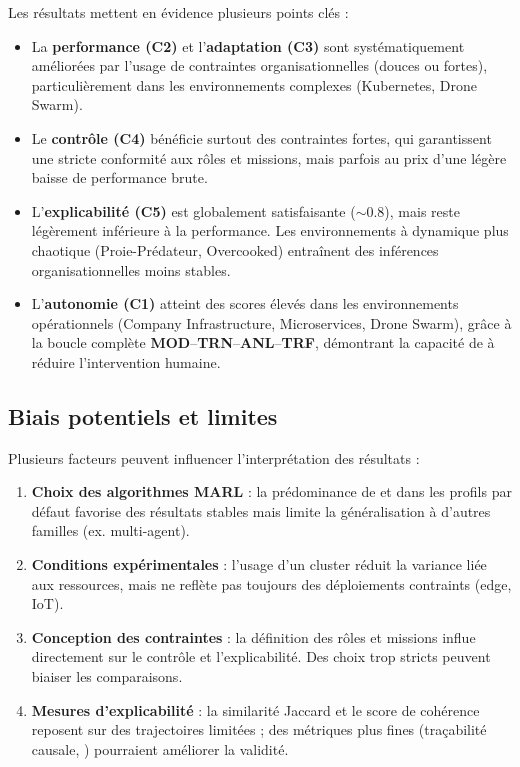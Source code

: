 Les résultats mettent en évidence plusieurs points clés :
\begin{itemize}
    \item La \textbf{performance (C2)} et l’\textbf{adaptation (C3)} sont systématiquement améliorées par l’usage de contraintes organisationnelles (douces ou fortes), particulièrement dans les environnements complexes (Kubernetes, Drone Swarm).
    \item Le \textbf{contrôle (C4)} bénéficie surtout des contraintes fortes, qui garantissent une stricte conformité aux rôles et missions, mais parfois au prix d’une légère baisse de performance brute.
    \item L’\textbf{explicabilité (C5)} est globalement satisfaisante ($\sim 0.8$), mais reste légèrement inférieure à la performance. Les environnements à dynamique plus chaotique (Proie-Prédateur, Overcooked) entraînent des inférences organisationnelles moins stables.
    \item L’\textbf{autonomie (C1)} atteint des scores élevés dans les environnements opérationnels (Company Infrastructure, Microservices, Drone Swarm), grâce à la boucle complète \textbf{MOD}–\textbf{TRN}–\textbf{ANL}–\textbf{TRF}, démontrant la capacité de  à réduire l’intervention humaine.
\end{itemize}

\subsection{Biais potentiels et limites}

Plusieurs facteurs peuvent influencer l’interprétation des résultats :
\begin{enumerate}[label={\alph*)}]
    \item \textbf{Choix des algorithmes MARL} : la prédominance de  et  dans les profils par défaut favorise des résultats stables mais limite la généralisation à d’autres familles (ex.  multi-agent).
    \item \textbf{Conditions expérimentales} : l’usage d’un cluster  réduit la variance liée aux ressources, mais ne reflète pas toujours des déploiements contraints (edge, IoT).
    \item \textbf{Conception des contraintes} : la définition des rôles et missions influe directement sur le contrôle et l’explicabilité. Des choix trop stricts peuvent biaiser les comparaisons.
    \item \textbf{Mesures d’explicabilité} : la similarité Jaccard et le score de cohérence reposent sur des trajectoires limitées ; des métriques plus fines (traçabilité causale, ) pourraient améliorer la validité.
\end{enumerate}

